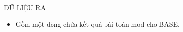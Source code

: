 DỮ LIỆU RA
\begin{itemize}
	\item     Gồm một dòng chứa kết quả bài toán mod cho BASE.   
\end{itemize}